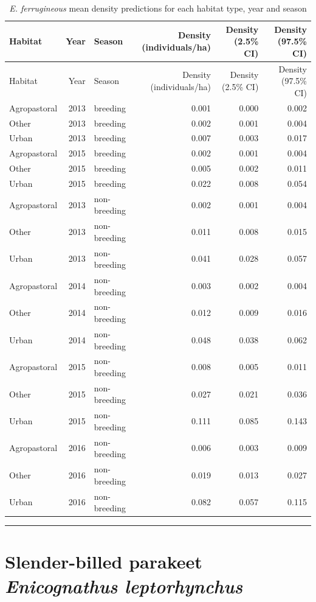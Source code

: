 \documentclass[]{article}
\begin{document}
\begin{longtable}[]{@{}lrlrrr@{}}
\caption{\textit{E. ferrugineous} mean density predictions for each
habitat type, year and season}\tabularnewline
\toprule
Habitat & Year & Season & Density (individuals/ha) & Density (2.5\% CI)
& Density (97.5\% CI)\tabularnewline
\midrule
\endfirsthead
\toprule
Habitat & Year & Season & Density (individuals/ha) & Density (2.5\% CI)
& Density (97.5\% CI)\tabularnewline
\midrule
\endhead
Agropastoral & 2013 & breeding & 0.001 & 0.000 & 0.002\tabularnewline
Other & 2013 & breeding & 0.002 & 0.001 & 0.004\tabularnewline
Urban & 2013 & breeding & 0.007 & 0.003 & 0.017\tabularnewline
Agropastoral & 2015 & breeding & 0.002 & 0.001 & 0.004\tabularnewline
Other & 2015 & breeding & 0.005 & 0.002 & 0.011\tabularnewline
Urban & 2015 & breeding & 0.022 & 0.008 & 0.054\tabularnewline
Agropastoral & 2013 & non-breeding & 0.002 & 0.001 &
0.004\tabularnewline
Other & 2013 & non-breeding & 0.011 & 0.008 & 0.015\tabularnewline
Urban & 2013 & non-breeding & 0.041 & 0.028 & 0.057\tabularnewline
Agropastoral & 2014 & non-breeding & 0.003 & 0.002 &
0.004\tabularnewline
Other & 2014 & non-breeding & 0.012 & 0.009 & 0.016\tabularnewline
Urban & 2014 & non-breeding & 0.048 & 0.038 & 0.062\tabularnewline
Agropastoral & 2015 & non-breeding & 0.008 & 0.005 &
0.011\tabularnewline
Other & 2015 & non-breeding & 0.027 & 0.021 & 0.036\tabularnewline
Urban & 2015 & non-breeding & 0.111 & 0.085 & 0.143\tabularnewline
Agropastoral & 2016 & non-breeding & 0.006 & 0.003 &
0.009\tabularnewline
Other & 2016 & non-breeding & 0.019 & 0.013 & 0.027\tabularnewline
Urban & 2016 & non-breeding & 0.082 & 0.057 & 0.115\tabularnewline
\bottomrule
\end{longtable}

\begin{center}\rule{0.5\linewidth}{\linethickness}\end{center}

\section{\texorpdfstring{Slender-billed parakeet \emph{Enicognathus
leptorhynchus}}{Slender-billed parakeet Enicognathus leptorhynchus}}\label{slender-billed-parakeet-enicognathus-leptorhynchus}
\end{document}

